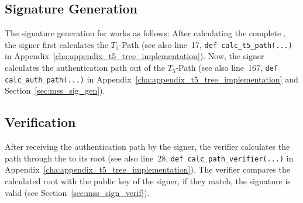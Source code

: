 \subsection{\texorpdfstring{\extree}{Ext. T5-Tree} Signature Generation}
The signature generation for \extree works as follows: After calculating the complete \extree, the signer first calculates the $T_5$-Path (see also line~17, \texttt{def calc_t5_path(...)} in Appendix~\ref{cha:appendix_t5_tree_implementation}).
Now, the signer calculates the authentication path out of the $T_5$-Path (see also line~167, \texttt{def calc_auth_path(...)} in Appendix~\ref{cha:appendix_t5_tree_implementation} and Section~\ref{sec:mss_sig_gen}).




\subsection{\texorpdfstring{\extree}{Ext. T5-Tree} Verification}
After receiving the authentication path by the signer, the verifier calculates the path through the \extree to its root (see also line~28, \texttt{def calc_path_verifier(...)} in Appendix~\ref{cha:appendix_t5_tree_implementation}). The verifier compares the calculated root with the public key of the signer, if they match, the signature is valid (see Section~\ref{sec:mss_sign_verif}).


